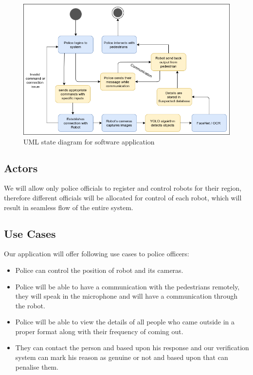 \documentclass[10pt,twocolumn,letterpaper]{article}
\begin{document}
\begin{figure}
  \includegraphics[width=\textwidth]{uml_state.png}
  \caption{UML state diagram for software application}
\end{figure}

\subsection{Actors}
We will allow only police officials to register and control robots for their region, therefore different officials will be allocated for control of each robot, which will result in seamless flow of the entire system.

\subsection{Use Cases} 
Our application will offer following use cases to police officers:
\begin{itemize}
    \item Police can control the position of robot and its cameras.
    \item  Police will be able to have a communication with the pedestrians remotely, they will speak in the microphone and will have a communication through the robot.
    \item  Police will be able to view the details of all people who came outside in a proper format along with their frequency of coming out.
    \item  They can contact the person and based upon his response and our verification system can mark his reason as genuine or not and based upon that can penalise them.
\end{itemize}
\end{document}
